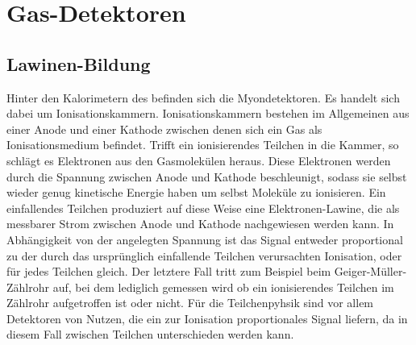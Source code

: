 \section{Gas-Detektoren}
\subsection{Lawinen-Bildung}
Hinter den Kalorimetern des \atlas befinden sich die Myondetektoren. Es handelt sich dabei um Ionisationskammern. Ionisationskammern bestehen im Allgemeinen aus einer Anode und einer Kathode zwischen denen sich ein Gas als Ionisationsmedium befindet. Trifft ein ionisierendes Teilchen in die Kammer, so schlägt es Elektronen aus den Gasmolekülen heraus. Diese Elektronen werden durch die Spannung zwischen Anode und Kathode beschleunigt, sodass sie selbst wieder genug kinetische Energie haben um selbst Moleküle zu ionisieren. Ein einfallendes Teilchen produziert auf diese Weise eine Elektronen-Lawine, die als messbarer Strom zwischen Anode und Kathode nachgewiesen werden kann. In Abhängigkeit von der angelegten Spannung ist das Signal entweder proportional zu der durch das ursprünglich einfallende Teilchen verursachten Ionisation, oder für jedes Teilchen gleich. Der letztere Fall tritt zum Beispiel beim Geiger-Müller-Zählrohr auf, bei dem lediglich gemessen wird ob ein ionisierendes Teilchen im Zählrohr aufgetroffen ist oder nicht. Für die Teilchenpyhsik sind vor allem Detektoren von Nutzen, die ein zur Ionisation proportionales Signal liefern, da in diesem Fall zwischen Teilchen unterschieden werden kann.
